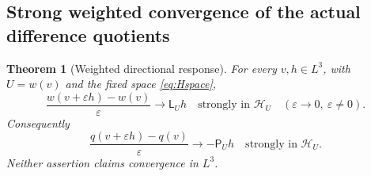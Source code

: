\documentclass[11pt,a4paper]{article}
\newtheorem{theorem}{Theorem}[section]
\theoremstyle{definition}\newtheorem{definition}[theorem]{Definition}
\theoremstyle{remark}\newtheorem{remark}[theorem]{Remark}
\newcommand{\HH}{\mathcal H}
\newcommand{\LP}{\mathsf L}
\newcommand{\GP}{\mathsf P}
\numberwithin{equation}{section}
\begin{document}
\subsection{Strong weighted convergence of the actual difference quotients}
\begin{theorem}[Weighted directional response]\label{thm:weightedresponse}
For every $v,h\in L^3$, with $U=w(v)$ and the fixed space \eqref{eq:Hspace},
\begin{equation}\label{eq:wresponse}
 \frac{w(v+\varepsilon h)-w(v)}{\varepsilon}
 \longrightarrow \LP_Uh
 \quad\text{strongly in }\HH_U
 \quad(\varepsilon\to0,\ \varepsilon\ne0).
\end{equation}
Consequently
\begin{equation}\label{eq:qresponse}
 \frac{q(v+\varepsilon h)-q(v)}{\varepsilon}
 \longrightarrow-\GP_Uh
 \quad\text{strongly in }\HH_U.
\end{equation}
Neither assertion claims convergence in $L^3$.
\end{theorem}
\end{document}
